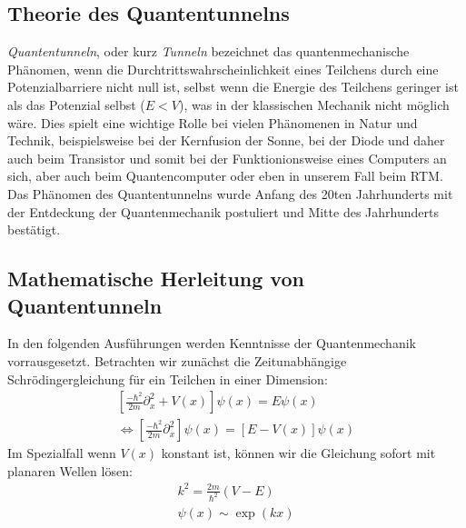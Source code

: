 \subsection{Theorie des Quantentunnelns}
\textit{Quantentunneln}, oder kurz \textit{Tunneln} 
bezeichnet das quantenmechanische Phänomen, wenn 
die Durchtrittswahrscheinlichkeit eines Teilchens
durch eine Potenzialbarriere nicht null ist, selbst wenn die Energie
des Teilchens geringer ist als das Potenzial selbst ($E < V$), was
in der klassischen Mechanik nicht möglich wäre. Dies
spielt eine wichtige Rolle bei
vielen Phänomenen in Natur und Technik,
beispielsweise bei der Kernfusion der Sonne, bei der Diode und
daher auch beim Transistor und somit bei der Funktionionsweise
eines Computers an sich, aber auch beim Quantencomputer oder
eben in unserem Fall beim RTM. Das Phänomen des Quantentunnelns
wurde Anfang des 20ten Jahrhunderts mit der Entdeckung der 
Quantenmechanik postuliert und Mitte des Jahrhunderts bestätigt.
\subsection{Mathematische Herleitung von Quantentunneln}
In den folgenden Ausführungen werden Kenntnisse der Quantenmechanik
vorrausgesetzt. Betrachten wir zunächst die Zeitunabhängige
Schrödingergleichung für ein Teilchen in einer Dimension:
\begin{align}
\left [ \frac{-\hbar^2}{2m}\partial_x^2 + V(x) \right ]\psi(x) = E\psi(x) \\ 
\Leftrightarrow \left [ \frac{-\hbar^2}{2m}\partial_x^2 \right ]\psi(x) = \left [E-V(x) \right ]\psi(x) 
\end{align}
Im Spezialfall wenn $V(x)$ konstant ist, können wir die Gleichung
sofort mit planaren Wellen lösen:
\begin{align}
    k^2 = \frac{2m}{\hbar^2}(V-E)\\
    \psi(x) \sim \exp(kx) 
\end{align}
